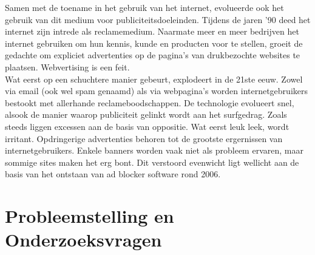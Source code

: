 \documentclass[pdftex,a4paper,12pt,twoside]{report}
\begin{document}
Samen met de toename in het gebruik van het internet, evolueerde ook het gebruik van dit medium voor publiciteitsdoeleinden. Tijdens de jaren ’90 deed het internet zijn intrede als reclamemedium. Naarmate meer en meer bedrijven het internet gebruiken om hun kennis, kunde en producten voor te stellen, groeit de gedachte om expliciet advertenties op de pagina’s van drukbezochte websites te plaatsen. Webvertising is een feit.
\\
Wat eerst op een schuchtere manier gebeurt, explodeert in de 21ste eeuw. Zowel via email (ook wel spam genaamd) als via webpagina’s worden internetgebruikers bestookt met allerhande reclameboodschappen. De technologie evolueert snel, alsook de manier waarop publiciteit gelinkt wordt aan het surfgedrag. Zoals steeds liggen excessen aan de basis van oppositie. Wat eerst leuk leek, wordt irritant. Opdringerige advertenties behoren tot de grootste ergernissen van internetgebruikers. Enkele banners worden vaak niet als probleem ervaren, maar sommige sites maken het erg bont. Dit verstoord evenwicht ligt wellicht aan de basis van het ontstaan van ad blocker software rond 2006.




\section{Probleemstelling en Onderzoeksvragen}
\label{sec:onderzoeksvragen}
\end{document}
